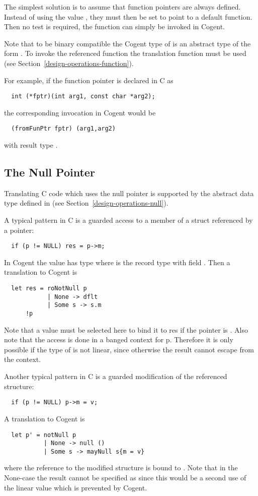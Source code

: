The simplest solution is to assume that function pointers are always defined. Instead of using the value 
, they must then be set to point to a default function. Then no test is required, the function
can simply be invoked in Cogent.

Note that to be binary compatible the Cogent type of  is an abstract type of the form .
To invoke the referenced function the translation function  must be used (see 
Section~\ref{design-operations-function}). 

For example, if the function pointer is declared in C as 
\begin{verbatim}
  int (*fptr)(int arg1, const char *arg2);
\end{verbatim}
the corresponding invocation in Cogent would be
\begin{verbatim}
  (fromFunPtr fptr) (arg1,arg2)
\end{verbatim}
with result type .

\subsection{The Null Pointer}
\label{app-transfunction-null}

Translating C code which uses the null pointer is supported by the abstract data type  defined
in  (see Section~\ref{design-operations-null}).

A typical pattern in C is a guarded access to a member of a struct referenced by a pointer:
\begin{verbatim}
  if (p != NULL) res = p->m;
\end{verbatim}
In Cogent the value  has type  where  is the record type with field . 
Then a translation to Cogent is
\begin{verbatim}
  let res = roNotNull p 
            | None -> dflt
            | Some s -> s.m
      !p
\end{verbatim}
Note that a value  must be selected here to bind it to res if the pointer is . Also note that the access is
done in a banged context for p. Therefore it is only possible if the type of  is not linear, since otherwise the result
cannot escape from the context.

Another typical pattern in C is a guarded modification of the referenced structure:
\begin{verbatim}
  if (p != NULL) p->m = v;
\end{verbatim}
A translation to Cogent is
\begin{verbatim}
  let p' = notNull p 
           | None -> null ()
           | Some s -> mayNull s{m = v}
\end{verbatim}
where the reference to the modified structure is bound to . Note that in the None-case the result cannot be specified as 
 since this would be a second use of the linear value  which is prevented by Cogent.


